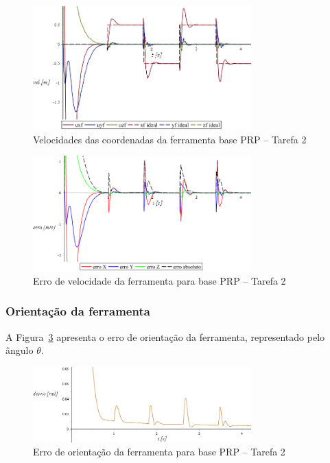 \begin{figure}[h!]
	\centering 
 	\includegraphics[width=0.75\textwidth]{figs/t2_velf_base_prp}
 	\caption{Velocidades das coordenadas da ferramenta base PRP --
 	Tarefa 2}
 	\label{fig::t2_velf_base_prp}
\end{figure}

\begin{figure}[h!]
	\centering 
 	\includegraphics[width=0.75\textwidth]{figs/t2_errovelf_base_prp}
 	\caption{Erro de velocidade da ferramenta para base PRP --
 	Tarefa 2}
 	\label{fig::t2_errovelf_base_prp}
\end{figure}


\subsubsection{Orientação da ferramenta}

A Figura~\ref{fig::t2_erroori_base_prp} apresenta o erro de orientação da
ferramenta, representado pelo ângulo $\theta$.

\begin{figure}[h!]
	\centering 
 	\includegraphics[width=0.75\textwidth]{figs/t2_erroori_base_prp}
 	\caption{Erro de orientação da ferramenta para base PRP -- Tarefa
 	2}
 	\label{fig::t2_erroori_base_prp}
\end{figure}



